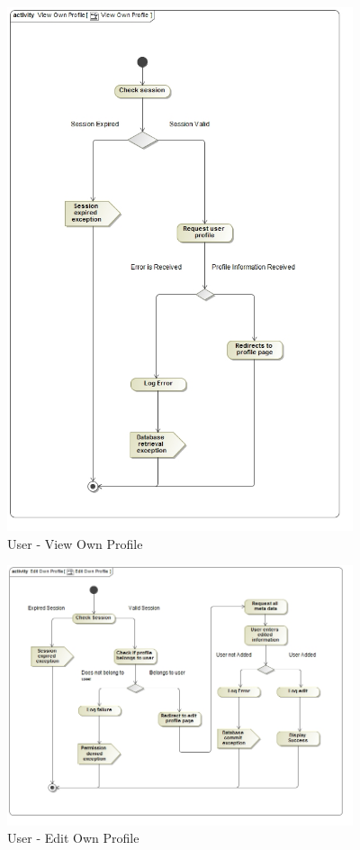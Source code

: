 \documentclass{article}
\begin{document}
			\begin{figure}[H]
				\includegraphics[width=4in, center]{../Diagrams/Process Specifications/User subsystem/View Own Profile.jpg}
				\caption{User - View Own Profile}
			\end{figure}
			\begin{figure}[H]
				\includegraphics[width=4in, center]{../Diagrams/Process Specifications/User subsystem/Edit Own Profile.jpg}
				\caption{User - Edit Own Profile}
			\end{figure}
\end{document}
